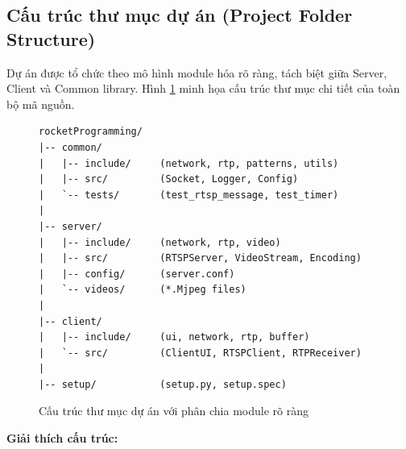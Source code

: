 \subsection{Cấu trúc thư mục dự án (Project Folder Structure)}

Dự án được tổ chức theo mô hình module hóa rõ ràng, tách biệt giữa Server, Client và Common library. Hình \ref{fig:folder_structure} minh họa cấu trúc thư mục chi tiết của toàn bộ mã nguồn.

\begin{figure}[H]
\centering
\begin{lstlisting}[basicstyle=\ttfamily\small, frame=single, xleftmargin=1cm]
rocketProgramming/
|-- common/
|   |-- include/     (network, rtp, patterns, utils)
|   |-- src/         (Socket, Logger, Config)
|   `-- tests/       (test_rtsp_message, test_timer)
|
|-- server/
|   |-- include/     (network, rtp, video)
|   |-- src/         (RTSPServer, VideoStream, Encoding)
|   |-- config/      (server.conf)
|   `-- videos/      (*.Mjpeg files)
|
|-- client/
|   |-- include/     (ui, network, rtp, buffer)
|   `-- src/         (ClientUI, RTSPClient, RTPReceiver)
|
|-- setup/           (setup.py, setup.spec)
\end{lstlisting}
\caption{Cấu trúc thư mục dự án với phân chia module rõ ràng}
\label{fig:folder_structure}
\end{figure}

\textbf{Giải thích cấu trúc:}

